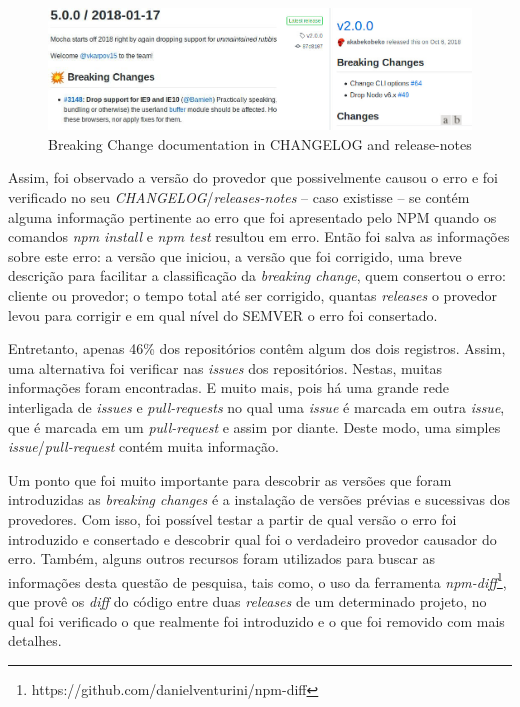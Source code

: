\begin{figure}
    \centering
    \includegraphics[scale=0.45]{figuras/bc_documentation.jpeg}
    \caption{Breaking Change documentation in CHANGELOG and release-notes}
    \label{fig:bc_documentation}
\end{figure}{}

Assim, foi observado a versão do provedor que possivelmente causou o erro e foi verificado no seu \textit{CHANGELOG}/\textit{releases-notes} -- caso existisse -- se contém alguma informação pertinente ao erro que foi apresentado pelo \gls{NPM} quando os comandos \textit{npm install} e \textit{npm test} resultou em erro. Então foi salva as informações sobre este erro: a versão que iniciou, a versão que foi corrigido, uma breve descrição para facilitar a classificação da \textit{breaking change}, quem consertou o erro: cliente ou provedor; o tempo total até ser corrigido, quantas \textit{releases} o provedor levou para corrigir e em qual nível do \gls{SEMVER} o erro foi consertado.

Entretanto, apenas 46\% dos repositórios contêm algum dos dois registros. Assim, uma alternativa foi verificar nas \textit{issues} dos repositórios. Nestas, muitas informações foram encontradas. E muito mais, pois há uma grande rede interligada de \textit{issues} e \textit{pull-requests} no qual uma \textit{issue} é marcada em outra \textit{issue}, que é marcada em um \textit{pull-request} e assim por diante. Deste modo, uma simples \textit{issue}/\textit{pull-request} contém muita informação.

Um ponto que foi muito importante para descobrir as versões que foram introduzidas as \textit{breaking changes} é a instalação de versões prévias e sucessivas dos provedores. Com isso, foi possível testar a partir de qual versão o erro foi introduzido e consertado e descobrir qual foi o verdadeiro provedor causador do erro. Também, alguns outros recursos foram utilizados para buscar as informações desta questão de pesquisa, tais como, o uso da ferramenta \textit{npm-diff}\footnote{https://github.com/danielventurini/npm-diff}, que provê os \textit{diff} do código entre duas \textit{releases} de um determinado projeto, no qual foi verificado o que realmente foi introduzido e o que foi removido com mais detalhes.

